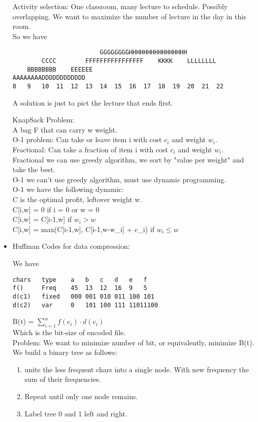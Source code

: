 \begin{itemize}
\begin{theorem}
		\end{theorem}
		\begin{example}
			Activity selection: One classroom, many lecture to schedule. Possibly overlapping. We want to maximize the number of lecture in the day in this room.\\
			So we have\\
			\begin{lstlisting}
                        GGGGGGGGHHHHHHHHHHHHHHHH
        CCCC        FFFFFFFFFFFFFFFF    KKKK    LLLLLLLL
    BBBBBBBB    EEEEEE
AAAAAAAADDDDDDDDDDDD
8	9	10	11	12	13	14	15	16	17	18	19	20	21	22
			\end{lstlisting}
			A solution is just to pict the lecture that ends first.
		\end{example}
		\begin{example}
			KnapSack Problem:\\
			A bag F that can carry w weight.\\
			O-1 problem: Can take or leave item i with cost $c_i$ and weight $w_i$.\\
			Fractional: Can take a fraction of item i with cost $c_i$ and weight $w_i$.\\
			Fractional we can use greedy algorithm, we sort by "value per weight" and take the best.\\
			O-1 we can't use greedy algorithm, must use dynamic programming.\\
			O-1 we have the following dynamic:\\
			C is the optimal profit, leftover weight w.\\
			C[i,w] = 0 if i = 0 or w = 0\\
			C[i,w] = C[i-1,w] if $w_i > w$\\
			C[i,w] = max(C[i-1,w], C[i-1,w-w_i] + c_i) if $w_i \leq w$\\
		\end{example}
	\item Huffman Codes for data compression:
		\begin{theorem}
			We have
			\begin{lstlisting}
chars	type	a	b	c	d	e	f
f()		Freq	45	13	12	16	9	5
d(c1)	fixed	000	001	010	011	100	101	
d(c2)	var		0	101	100	111	11011100
\end{lstlisting}
B(t) = $\sum_{i=1}^{n} f(c_i) \cdot d(c_i)$\\
Which is the bit-size of encoded file.\\
Problem: We want to minimize number of bit, or equivalently, minimize B(t).\\
We build a binary tree as follows:
\begin{enumerate}
	\item unite the less frequent chars into a single node. With new frequency the sum of their frequencies.
	\item Repeat until only one node remains.
	\item Label tree 0 and 1 left and right.
\end{enumerate}
		\end{theorem}
\end{itemize}

